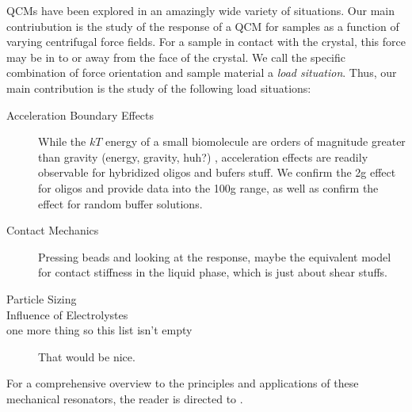 QCMs have been explored in an amazingly wide variety of situations.  Our
main contriubution is the study of the response of a QCM for samples as a
function of varying centrifugal force fields.  For a sample in contact with
the crystal, this force may be in to or away from the face of the
crystal.  We call the specific combination of force orientation and sample
material a \textit{load situation}.  Thus, our main contribution is the
study of the following load situations:

\begin{description}
\item[{Acceleration Boundary Effects}] While the $kT$ energy of a
small biomolecule are orders of magnitude greater than gravity (energy,
gravity, huh?)
, acceleration effects are readily observable for hybridized
oligos and bufers stuff.  We confirm the 2g effect for oligos and provide
data into the 100g range, as well as confirm the effect for random buffer
solutions.
\item[{Contact Mechanics}] Pressing beads and looking at the response,
 maybe the equivalent model for contact stiffness in the liquid phase,
 which is just about shear stuffs.
\item[{Particle Sizing}]
\item[{Influence of Electrolystes}]
\item[{one more thing so this list isn't empty}] That would be nice.
\end{description}

For a comprehensive overview to the principles and applications of these
mechanical resonators, the reader is directed to \cite{steinemreview}.

